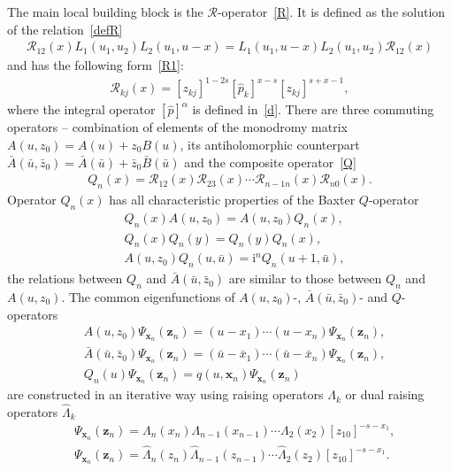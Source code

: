 \documentclass[10pt,a4paper]{amsart}
\renewcommand{\imath}{\mathrm{i}}
\numberwithin{equation}{section}
\begin{document}
The main local building block is the $\mathcal{R}$-operator~\eqref{R}.
It is defined as the solution of the relation~\eqref{defR}
\begin{align*}
	\mathcal{R}_{1 2}(x) L_1(u_1, u_2) L_2(u_1, u-x) =
	L_1(u_1, u-x) L_2(u_1, u_2) \mathcal{R}_{1 2}(x)
\end{align*}
and has the following form~\eqref{R1}:
\begin{align*}
	\mathcal{R}_{k j}(x) = [z_{kj}]^{1-2s} [\hat{p}_k]^{x-s} [z_{kj}]^{s+x-1} ,
\end{align*}
where the integral operator $[\hat{p}]^\alpha$ is defined in~\eqref{d}.
There are three commuting operators -- combination of elements
of the monodromy matrix $A(u,z_0) = A(u)+z_0 B(u)$, its antiholomorphic counterpart $\bar{A}(\bar{u},\bar{z}_0) = \bar{A}(\bar{u})+\bar{z}_0 \bar{B}(\bar{u})$ and the composite
operator~\eqref{Q}
\begin{align*}
	Q_n(x) =
	\mathcal{R}_{12}(x) \mathcal{R}_{23}(x)\cdots
	\mathcal{R}_{n-1 n}(x) \mathcal{R}_{n 0}(x) .
\end{align*}
Operator $Q_n(x)$ has all characteristic properties of the Baxter $Q$-operator
\begin{align*}
	& Q_n(x) A(u,z_0) = A(u,z_0) Q_n(x) , \\
	& Q_n(x) Q_n(y) = Q_n(y) Q_n(x) ,\\
	& A(u,z_0) Q_n(u,\bar{u}) = \imath^n Q_n(u+1,\bar{u}) ,
\end{align*}
the relations between $Q_n$ and $\bar{A}(\bar{u},\bar{z}_0)$ are similar to those between $Q_n$ and $A(u,z_0)$.
The common eigenfunctions of $A(u,z_0)$-, $\bar{A}(\bar{u},\bar{z}_0)$- and $Q$-operators
\begin{align*}
	& A(u,z_0)
	\Psi_{\bm{x}_n}(\bm z_n) = (u-x_1)\cdots(u-x_n)
	\Psi_{\bm{x}_n}(\bm z_n) , \\
	& \bar{A}(\bar{u},\bar{z}_0)
	\Psi_{\bm{x}_n}(\bm z_n) = (\bar{u}-\bar{x}_1)\cdots(\bar{u}-\bar{x}_n)
	\Psi_{\bm{x}_n}(\bm z_n) , \\
	& Q_n(u) \Psi_{\bm x_n}(\bm z_n)
	= q(u ,\bm x_{n}) \Psi_{\bm x_n}(\bm z_n)
\end{align*}
are constructed in an iterative way using raising
operators $\Lambda_k$ or dual raising operators $\hat{\Lambda}_k$
\begin{align*}
	&\Psi_{\bm{x}_n}(\bm z_n)=
	\Lambda_n( x_n)
	\Lambda_{n-1}( x_{n-1})\cdots
	\Lambda_{2}( x_{2}) [z_{10}]^{-s-x_1} , \\
	&\Psi_{\bm{x}_n}(\bm z_n)=
	\hat{\Lambda}_n( z_n)
	\hat{\Lambda}_{n-1}( z_{n-1})\cdots
	\hat{\Lambda}_{2}(z_{2}) [z_{10}]^{-s-x_1} .
\end{align*}
\end{document}
